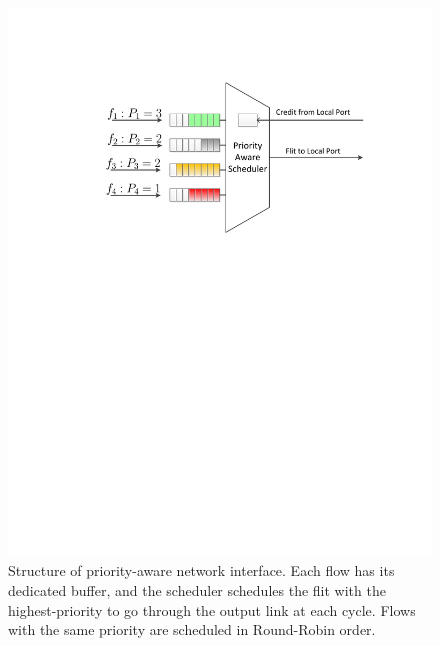 \documentclass[preprint]{elsarticle}
\begin{document}
\begin{figure}
  \centering
  \includegraphics[scale=0.45]{fig5.pdf}
  \caption{Structure of priority-aware network interface. Each flow has its dedicated buffer, and the scheduler schedules the flit with the highest-priority to go through the output link at each cycle. Flows with the same priority are scheduled in Round-Robin order.}\label{ni}
\end{figure}
\end{document}
